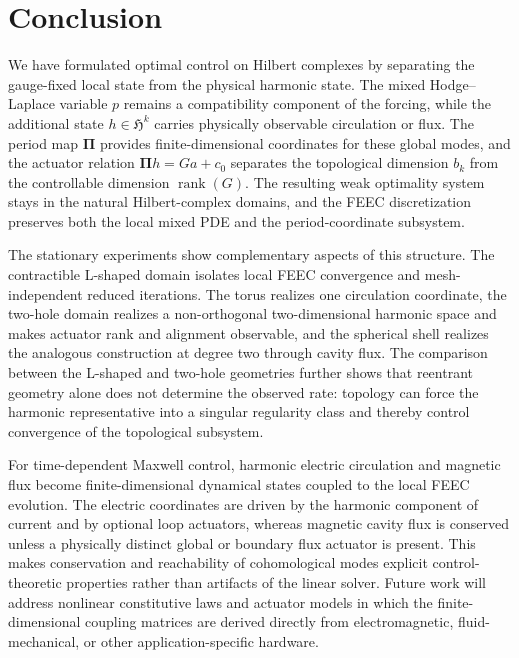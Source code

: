 \documentclass{article}
\newcommand{\todogt}[2][]{\todo[color=green!25,#1]{GT: #2}}
\newcommand{\HH}{\mathfrak H}
\newcommand{\Piop}{\boldsymbol\Pi}
\begin{document}
\section{Conclusion}
We have formulated optimal control on Hilbert complexes by separating the gauge-fixed local state from the physical harmonic state. The mixed Hodge--Laplace variable $p$ remains a compatibility component of the forcing, while the additional state $h\in\HH^k$ carries physically observable circulation or flux. The period map $\Piop$ provides finite-dimensional coordinates for these global modes, and the actuator relation $\Piop h=Ga+c_0$ separates the topological dimension $b_k$ from the controllable dimension $\operatorname{rank}(G)$. The resulting weak optimality system stays in the natural Hilbert-complex domains, and the FEEC discretization preserves both the local mixed PDE and the period-coordinate subsystem.

The stationary experiments show complementary aspects of this structure. The contractible L-shaped domain isolates local FEEC convergence and mesh-independent reduced iterations. The torus realizes one circulation coordinate, the two-hole domain realizes a non-orthogonal two-dimensional harmonic space and makes actuator rank and alignment observable, and the spherical shell realizes the analogous construction at degree two through cavity flux. The comparison between the L-shaped and two-hole geometries further shows that reentrant geometry alone does not determine the observed rate: topology can force the harmonic representative into a singular regularity class and thereby control convergence of the topological subsystem.

For time-dependent Maxwell control, harmonic electric circulation and magnetic flux become finite-dimensional dynamical states coupled to the local FEEC evolution. The electric coordinates are driven by the harmonic component of current and by optional loop actuators, whereas magnetic cavity flux is conserved unless a physically distinct global or boundary flux actuator is present. This makes conservation and reachability of cohomological modes explicit control-theoretic properties rather than artifacts of the linear solver. Future work will address nonlinear constitutive laws and actuator models in which the finite-dimensional coupling matrices are derived directly from electromagnetic, fluid-mechanical, or other application-specific hardware.

\end{document}
